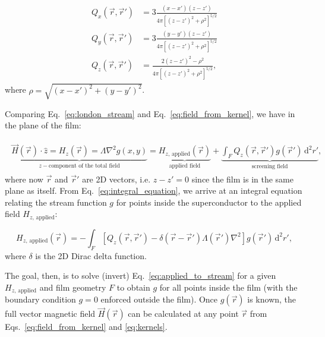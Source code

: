 \documentclass[final,3p,times]{elsarticle}
\newcounter{bla}
\begin{document}
\begin{align}
    \label{eq:kernels}
    \begin{split}
        Q_x(\vec{r}, \vec{r}') &=  3\frac{(x-x')(z-z')}
        {4\pi[(z-z')^2+\rho^2]^{5/2}}\\
        Q_y(\vec{r}, \vec{r}') &=  3\frac{(y-y')(z-z')}
        {4\pi[(z-z')^2+\rho^2]^{5/2}}\\
        Q_z(\vec{r}, \vec{r}') &=  \frac{2(z-z')^2-\rho^2}
        {4\pi[(z-z')^2+\rho^2]^{5/2}},
    \end{split}
\end{align}
where $\rho=\sqrt{(x-x')^2 + (y-y')^2}$.

Comparing Eq.~\ref{eq:london_stream} and Eq.~\ref{eq:field_from_kernel}, we have in the plane of the film:

\begin{align}
    \label{eq:integral_equation}
    \begin{split}
        \underbrace{\vec{H}(\vec{r})\cdot\hat{z} = H_z(\vec{r})
        = \Lambda\nabla^2g(x, y)}_{z-\text{component of the total field}}
        = \underbrace{H_{z,\,\mathrm{applied}}(\vec{r})}_{\text{applied field}}
        + \underbrace{\int_F Q_z(\vec{r},\vec{r}')g(\vec{r}')\,\mathrm{d}^2r'}_{\text{screening field}},
    \end{split}
\end{align}
where now $\vec{r}$ and $\vec{r}'$ are 2D vectors, i.e. $z-z'=0$ since the film is in the same plane as itself. From Eq.~\ref{eq:integral_equation}, we arrive at an integral equation relating the stream function $g$ for points inside the superconductor to the applied field $H_{z,\,\mathrm{applied}}$:

\begin{equation}
    \label{eq:applied_to_stream}
    H_{z,\,\mathrm{applied}}(\vec{r})
    = -\int_F\left[
        Q_z(\vec{r},\vec{r}')-\delta(\vec{r}-\vec{r}')\Lambda(\vec{r}')\nabla^2\right
    ]g(\vec{r}')\,\mathrm{d}^2r',
\end{equation}
where $\delta$ is the 2D Dirac delta function.

The goal, then, is to solve (invert) Eq.~\ref{eq:applied_to_stream} for a given $H_{z,\,\mathrm{applied}}$ and film geometry $F$ to obtain $g$ for all points inside the film (with the boundary condition $g=0$ enforced outside the film). Once $g(\vec{r})$ is known, the full vector magnetic field $\vec{H}(\vec{r})$ can be calculated at any point $\vec{r}$
from Eqs.~\ref{eq:field_from_kernel} and \ref{eq:kernels}.
\end{document}
